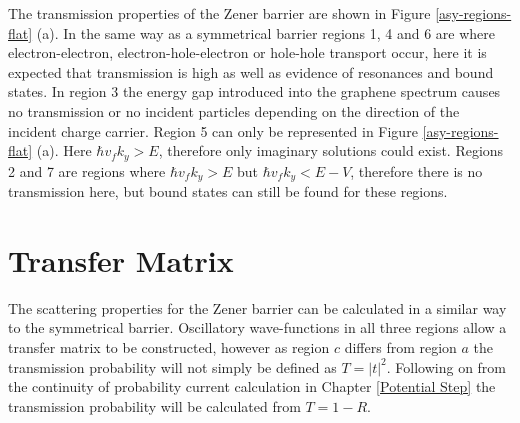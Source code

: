 	The transmission properties of the Zener barrier are shown in Figure \ref{asy-regions-flat} (a). In the same way as a symmetrical barrier regions 1, 4 and 6 are where electron-electron, electron-hole-electron or hole-hole transport occur, here it is expected that transmission is high as well as evidence of resonances and bound states. In region 3 the energy gap introduced into the graphene spectrum causes no transmission or no incident particles depending on the direction of the incident charge carrier. Region 5 can only be represented in Figure \ref{asy-regions-flat} (a). Here $\hbar v_{f} k_{y}>E$, therefore only imaginary solutions could exist. Regions 2 and 7 are regions where $\hbar v_{f} k_{y}>E$ but  $\hbar v_{f} k_{y}<E-V$, therefore there is no transmission here, but bound states can still be found for these regions.


	\section{Transfer Matrix}
	\label{Asymmetrical Barrier - Transfer Matrix}
		The scattering properties for the Zener barrier can be calculated in a similar way to the symmetrical barrier. Oscillatory wave-functions in all three regions allow a transfer matrix to be constructed, however as region $c$ differs from region $a$ the transmission probability will not simply be defined as $T=|t|^{2}$. Following on from the continuity of probability current calculation in Chapter \ref{Potential Step} the transmission probability will be calculated from $T=1-R$.

